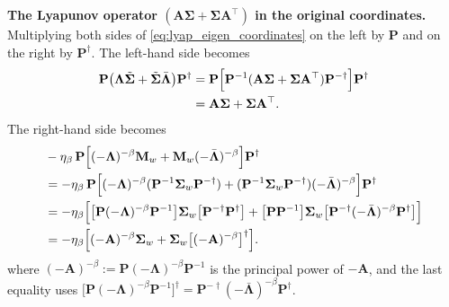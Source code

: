 \documentclass[12pt]{article}
\begin{document}
\textbf{The Lyapunov operator $(\mathbf A\boldsymbol\Sigma+\boldsymbol\Sigma\mathbf A^\top)$ in the original coordinates.}
Multiplying both sides of \eqref{eq:lyap_eigen_coordinates} on the left by $\mathbf{P}$ and on the right by $\mathbf{P}^{\dagger}$.
The left-hand side becomes
\begin{equation}
\begin{aligned}
    \mathbf{P}\bigl(\boldsymbol\Lambda\tilde{\boldsymbol\Sigma}
      +\tilde{\boldsymbol\Sigma}\bar{\boldsymbol\Lambda}\bigr)\mathbf{P}^{\dagger}
    &=\mathbf{P}\Bigl[\mathbf{P}^{-1}
      (\mathbf{A}\boldsymbol\Sigma+\boldsymbol\Sigma\mathbf{A}^{\top})
      \mathbf{P}^{-\dagger}\Bigr]\mathbf{P}^{\dagger}\\
    &=\mathbf{A}\boldsymbol\Sigma+\boldsymbol\Sigma\mathbf{A}^{\top}.
\end{aligned}
    \label{eq:lyap_return_left}
\end{equation}
The right-hand side becomes
\begin{equation}
\begin{aligned}
    &-\eta_\beta\,\mathbf{P}\Bigl[
      (-\boldsymbol{\Lambda})^{-\beta}\mathbf{M}_w
      +\mathbf{M}_w(-\bar{\boldsymbol{\Lambda}})^{-\beta}
      \Bigr]\mathbf{P}^{\dagger}\\
    &=-\eta_\beta\,\mathbf{P}\Bigl[
      (-\boldsymbol{\Lambda})^{-\beta}(\mathbf{P}^{-1}\boldsymbol{\Sigma}_w\mathbf{P}^{-\dagger})
      +(\mathbf{P}^{-1}\boldsymbol{\Sigma}_w\mathbf{P}^{-\dagger})(-\bar{\boldsymbol{\Lambda}})^{-\beta}
      \Bigr]\mathbf{P}^{\dagger}\\
    &=-\eta_\beta\Bigl[
      \bigl[\mathbf{P}(-\boldsymbol{\Lambda})^{-\beta}\mathbf{P}^{-1}\bigr]\boldsymbol{\Sigma}_w
      \bigl[\mathbf{P}^{-\dagger}\mathbf{P}^{\dagger}\bigr]
      +\bigl[\mathbf{P}\mathbf{P}^{-1}\bigr]\boldsymbol{\Sigma}_w
      \bigl[\mathbf{P}^{-\dagger}(-\bar{\boldsymbol{\Lambda}})^{-\beta}\mathbf{P}^{\dagger}\bigr]
      \Bigr]\\
    &=-\eta_\beta\Bigl[
      (-\mathbf{A})^{-\beta}\boldsymbol{\Sigma}_w
      +\boldsymbol{\Sigma}_w\bigl[(-\mathbf{A})^{-\beta}\bigr]^{\dagger}
      \Bigr].
\end{aligned}
    \label{eq:lyap_return_right}
\end{equation}
where $(-\mathbf{A})^{-\beta}:=\mathbf{P}(-\boldsymbol{\Lambda})^{-\beta}\mathbf{P}^{-1}$ is the principal power of $-\mathbf{A}$, and the
last equality uses
$\bigl[\mathbf{P}(-\boldsymbol{\Lambda})^{-\beta}\mathbf{P}^{-1}\bigr]^{\dagger}=\mathbf{P}^{-\dagger}(-\bar{\boldsymbol{\Lambda}})^{-\beta}\mathbf{P}^{\dagger}$.
\end{document}
